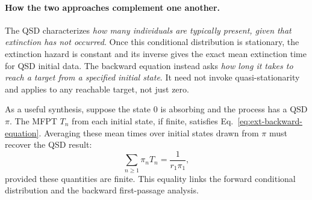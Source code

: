 \paragraph{How the two approaches complement one another.}
The QSD characterizes \emph{how many individuals are typically present,
given that extinction has not occurred}. Once this conditional
distribution is stationary, the extinction hazard is constant and its
inverse gives the exact mean extinction time for QSD initial data.
The backward equation instead asks \emph{how long it takes to reach a
target from a specified initial state}. It need not invoke
quasi-stationarity and applies to any reachable target, not just zero.

As a useful synthesis, suppose the state $0$ is absorbing and the
process has a QSD $\pi$. The MFPT $T_n$ from each initial state, if
finite, satisfies Eq.~\eqref{eq:ext-backward-equation}. Averaging these
mean times over initial states drawn from $\pi$ must recover the QSD
result:
\begin{equation}
 \boxed{\sum_{n\geq1}\pi_nT_n=\frac{1}{r_1\pi_1},}
 \label{eq:ext-bridge}
\end{equation}
provided these quantities are finite. This equality links the forward
conditional distribution and the backward first-passage analysis.

